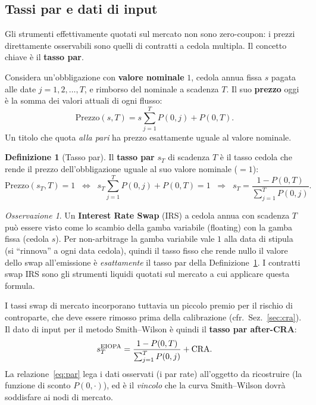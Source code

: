 \documentclass[11pt,a4paper]{article}
\theoremstyle{plain}
\theoremstyle{definition}
\newtheorem{definizione}[teorema]{Definizione}
\theoremstyle{remark}
\newtheorem*{osservazione}{Osservazione}
\newcommand{\CRA}{\ensuremath{\mathrm{CRA}}}
\begin{document}
\subsection{Tassi par e dati di input}
\label{sec:inputdati}

Gli strumenti effettivamente quotati sul mercato non sono zero-coupon: i prezzi
direttamente osservabili sono quelli di contratti a cedola multipla. Il concetto chiave
\`e il \textbf{tasso par}.

Considera un'obbligazione con \textbf{valore nominale} $1$, cedola annua fissa $s$ pagata
alle date $j = 1, 2, \ldots, T$, e rimborso del nominale a scadenza $T$. Il suo
\textbf{prezzo} oggi \`e la somma dei valori attuali di ogni flusso:
\[
  \text{Prezzo}(s, T)
  = s \sum_{j=1}^{T} P(0,j) + P(0,T).
\]
Un titolo che quota \emph{alla pari} ha prezzo esattamente uguale al valore nominale.

\begin{definizione}[Tasso par]
\label{def:par}
Il \textbf{tasso par} $s_T$ di scadenza $T$ \`e il tasso cedola che rende il prezzo
dell'obbligazione uguale al suo valore nominale ($= 1$):
\[
  \text{Prezzo}(s_T, T) = 1
  \;\;\Longleftrightarrow\;\;
  s_T \sum_{j=1}^{T} P(0,j) + P(0,T) = 1
  \;\;\Longrightarrow\;\;
  s_T = \frac{1 - P(0,T)}{\displaystyle\sum_{j=1}^{T} P(0,j)}.
\]
\end{definizione}

\begin{osservazione}
Un \textbf{Interest Rate Swap} (IRS) a cedola annua con scadenza $T$ pu\`o essere visto
come lo scambio della gamba variabile (floating) con la gamba fissa (cedola $s$). Per
non-arbitrage la gamba variabile vale $1$ alla data di stipula (si ``rinnova'' a ogni data
cedola), quindi il tasso fisso che rende nullo il valore dello swap all'emissione \`e
\emph{esattamente} il tasso par della Definizione~\ref{def:par}. I contratti swap IRS sono
gli strumenti liquidi quotati sul mercato a cui applicare questa formula.
\end{osservazione}

I tassi swap di mercato incorporano tuttavia un piccolo premio per il rischio di
controparte, che deve essere rimosso prima della calibrazione (cfr.\ Sez.~\ref{sec:cra}).
Il dato di input per il metodo Smith--Wilson \`e quindi il \textbf{tasso par
after-CRA}:
\begin{equation}
  s_T^{\rm EIOPA} = \frac{1 - P(0,T)}{\sum_{j=1}^{T} P(0,j)} + \CRA .
  \label{eq:par}
\end{equation}
La relazione~\eqref{eq:par} lega i dati osservati (i par rate) all'oggetto da ricostruire
(la funzione di sconto $P(0,\cdot)$), ed \`e il \emph{vincolo} che la curva Smith--Wilson
dovr\`a soddisfare ai nodi di mercato.
\end{document}
